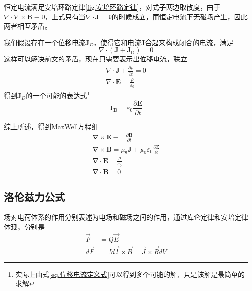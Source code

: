 		恒定电流满足安培环路定律\ref{fig.安培环路定律}，对式子两边取散度，由于$\nabla \cdot \nabla \times \boldsymbol{B} \equiv 0$，上式只有当$\nabla \cdot \boldsymbol{J}=0$的时候成立，而恒定电流下无磁场产生，因此两者相互矛盾。

		我们假设存在一个位移电流$\boldsymbol{J}_D$，使得它和电流$\boldsymbol{J}$合起来构成闭合的电流，满足
		\begin{equation}
		\nabla \cdot\left(\boldsymbol{J}+\boldsymbol{J}_{\mathrm{D}}\right)=0
		\label{eq.位移电流定义式}
		\end{equation}
		这样可以解决前文的矛盾，现在只需要表示出位移电流，联立
		\begin{equation}
		\begin{gathered}
			\nabla \cdot \boldsymbol{J}+\frac{\partial \rho}{\partial t}=0 \\
			\nabla \cdot \boldsymbol{E}=\frac{\rho}{\varepsilon_{0}}
		\end{gathered}
		\end{equation}
		得到$\boldsymbol{J}_D$的一个可能的表达式\footnote{实际上由式\ref{eq.位移电流定义式}可以得到多个可能的解，只是该解是最简单的求解}
		\begin{equation}
			\boldsymbol{J}_{\mathbf{D}}=\varepsilon_{0} \frac{\partial \boldsymbol{E}}{\partial t}
		\end{equation}

		\par \qquad

		综上所述，得到MaxWell方程组
		\begin{equation}
			\boxed{\begin{gathered}
		\boldsymbol{\nabla} \times \boldsymbol{E}=-\frac{\partial \boldsymbol{B}}{\partial t} \\
		\boldsymbol{\nabla} \times \boldsymbol{B}=\mu_{0} \boldsymbol{J}+\mu_{0} \varepsilon_{0} \frac{\partial \boldsymbol{E}}{\partial t} \\
		\boldsymbol{\nabla} \cdot \boldsymbol{E}=\frac{\rho}{\varepsilon_{0}} \\
		\boldsymbol{\nabla} \cdot \boldsymbol{B}=0
		\end{gathered}}
		\end{equation}

	\subsection{洛伦兹力公式}
		场对电荷体系的作用分别表述为电场和磁场之间的作用，通过库仑定律和安培定律体现，分别是
			\begin{equation}
				\begin{aligned}
				\vec{F}&=Q \vec{E} \\
				d \vec{F}&=I d \vec{l} \times \vec{B}=\vec{J} \times \vec{B} d V
				\end{aligned}
			\end{equation}

